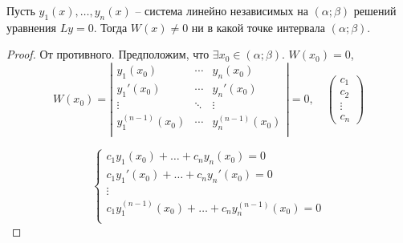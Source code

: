 

\begin{theorem}
    Пусть $y_1(x), \ldots, y_n(x)$ -- система линейно независимых на $(\alpha;\beta)$ решений уравнения $Ly = 0$. Тогда $W(x) \ne 0$ ни в какой точке интервала $(\alpha;\beta)$.
\end{theorem}

\begin{proof}
    От противного. Предположим, что $\exists x_0 \in (\alpha;\beta)$. $W(x_0) = 0$,
    \[
        W(x_0) = \left|\begin{array}{ccc}
            y_1(x_0)         & \cdots & y_n(x_0)         \\
            y_1'(x_0)        & \cdots & y_n'(x_0)        \\
            \vdots           & \ddots & \vdots           \\
            y_1^{(n-1)}(x_0) & \cdots & y_n^{(n-1)}(x_0) \\
        \end{array}\right| = 0, \quad \left(\begin{array}{c}
                c_1    \\
                c_2    \\
                \vdots \\
                c_n
            \end{array}\right)
    \]

    \begin{equation}\label{eq35}
        \left\{\begin{array}{l}
            c_1y_1(x_0) + \ldots + c_ny_n(x_0) = 0                 \\
            c_1y_1'(x_0) + \ldots + c_ny_n'(x_0) = 0               \\
            \vdots                                                 \\
            c_1y_1^{(n-1)}(x_0) + \ldots + c_ny_n^{(n-1)}(x_0) = 0 \\
        \end{array}\right.
    \end{equation}


\end{proof}

